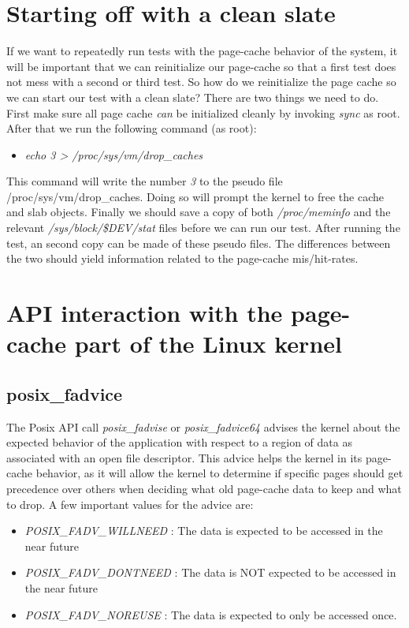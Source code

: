 \section{Starting off with a clean slate}
If we want to repeatedly run tests with the page-cache behavior of the system, it will be important that we can reinitialize our page-cache so that a first test does not mess with a second or third test. So how do we reinitialize the page cache so we can start our test with a clean slate? There are two things we need to do.  First make sure all page cache \emph{can} be initialized cleanly by invoking \emph{sync} as root. After that we run the following command (as root):
\begin{itemize}
\item \emph{echo 3 > /proc/sys/vm/drop\_caches}
\end{itemize}
This command will write the number \emph{3} to the pseudo file /proc/sys/vm/drop\_caches. Doing so will prompt the kernel to free the cache and slab objects. Finally we should save a copy of both \emph{/proc/meminfo} and the relevant \emph{/sys/block/\$DEV/stat} files before we can run our test. After running the test, an second copy can be made of these pseudo files. The differences between the two should yield information related to the page-cache mis/hit-rates.
\section{API interaction with the page-cache part of the Linux kernel}
\subsection{posix\_fadvice}
The Posix API call \emph{posix\_fadvise} or \emph{posix\_fadvice64} advises the kernel about the expected behavior of the application with respect to a region of data as associated with an open file descriptor. This advice helps the kernel in its page-cache behavior, as it will allow the kernel to determine if specific pages should get precedence over others when deciding what old page-cache data to keep and what to drop. A few important values for the advice are:
\begin{itemize}
\item \emph{POSIX\_FADV\_WILLNEED} : The data is expected to be accessed in the near future
\item \emph{POSIX\_FADV\_DONTNEED} : The data is NOT expected to be accessed in the near future
\item \emph{POSIX\_FADV\_NOREUSE} : The data is expected to only be accessed once.
\end{itemize}
